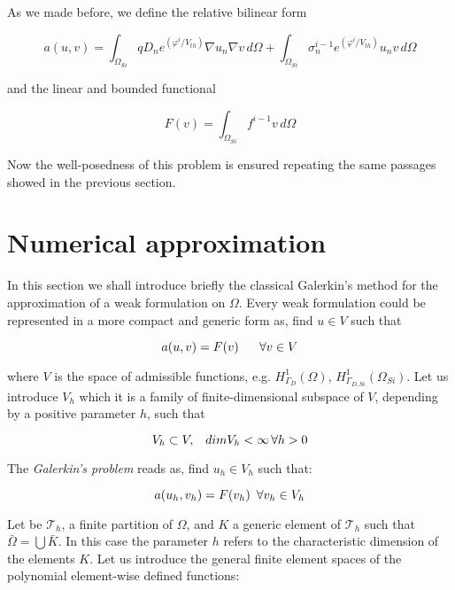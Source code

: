 As we made before, we define the relative bilinear form

\begin{equation}
\label{eq: bilinear form LEC}
a(u,v) =  \int_{\Omega_{Si}}  q D_n e^{(\varphi^{i}/V_{th})} \nabla u_n \nabla v \, d\Omega + \int_{\Omega_{Si}} \sigma_n^{i-1} e^{(\varphi^{i}/V_{th})} u_n v \, d\Omega
\end{equation}

and the linear and bounded functional

\begin{equation}
\label{eq: functional LEC}
F(v) = \int_{\Omega_{Si}} f^{i-1}v \, d\Omega
\end{equation}

Now the well-posedness of this problem is ensured repeating the same passages showed in the previous section.



\section{Numerical approximation}
\label{sec: Numerical approximation}


In this section we shall introduce briefly the classical Galerkin's method for the approximation of a weak formulation on $\Omega$. Every weak formulation could be represented in a more compact and generic form as, find $u \in V$ such that

\begin{equation}
a(u,v) = F(v) \psp{10} \forall v \in V
\end{equation}

where $V$ is the space of admissible functions, e.g. $H^1_{\Gamma_D}(\Omega)$, $H^1_{\Gamma_{D,Si}}(\Omega_{Si})$.
 Let us introduce $V_h$ which it is a family of finite-dimensional subspace of $V$, depending by a positive parameter $h$, such that

\begin{equation}
V_h \subset V, \psp{5} dim V_h < \infty \, \forall h>0
\end{equation}

The \textit{Galerkin's problem} reads as, find $u_h\in V_h$ such that:

\begin{equation}
\label{eq: general galerkin problem}
 a(u_h,v_h) = F(v_h) \psp{3} \forall v_h \in V_h
\end{equation}

Let be $\mathcal{T}_h$, a finite partition of $\Omega$, and $K$ a generic element of $\mathcal{T}_h$ such that  $\bar{\Omega} =  \bigcup \bar{K}$. In this case the parameter $h$ refers to the characteristic dimension of the elements $K$.
Let us introduce the general finite element spaces of the polynomial element-wise defined functions:

